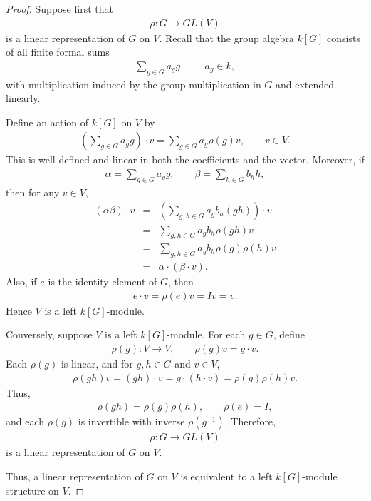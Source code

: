 \documentclass[10pt,a4paper]{amsart}
\begin{document}
\begin{proof}
Suppose first that
\begin{eqnarray}
\rho:G \to GL(V)
\end{eqnarray}
is a linear representation of $G$ on $V$. Recall that the group algebra
$k[G]$ consists of all finite formal sums
\begin{eqnarray}
\sum_{g \in G} a_g g, \qquad a_g \in k,
\end{eqnarray}
with multiplication induced by the group multiplication in $G$ and extended
linearly.

Define an action of $k[G]$ on $V$ by
\begin{eqnarray}
\left(\sum_{g \in G} a_g g\right)\cdot v
=
\sum_{g \in G} a_g \rho(g)v,
\qquad v \in V.
\end{eqnarray}
This is well-defined and linear in both the coefficients and the vector.
Moreover, if
\begin{eqnarray}
\alpha = \sum_{g \in G} a_g g, \qquad
\beta = \sum_{h \in G} b_h h,
\end{eqnarray}
then for any $v\in V$,
\begin{eqnarray*}
(\alpha\beta)\cdot v
&=&
\left(\sum_{g,h \in G} a_g b_h (gh)\right)\cdot v \\
&=&
\sum_{g,h \in G} a_g b_h \rho(gh)v \\
&=&
\sum_{g,h \in G} a_g b_h \rho(g)\rho(h)v \\
&=&
\alpha \cdot (\beta \cdot v).
\end{eqnarray*}
Also, if $e$ is the identity element of $G$, then
\begin{eqnarray*}
e \cdot v = \rho(e)v = Iv = v.
\end{eqnarray*}
Hence $V$ is a left $k[G]$-module.

Conversely, suppose $V$ is a left $k[G]$-module. For each $g \in G$, define
\begin{eqnarray}
\rho(g):V \to V, \qquad \rho(g)v = g \cdot v.
\end{eqnarray}
Each $\rho(g)$ is linear, and for $g,h \in G$ and $v \in V$,
\begin{eqnarray*}
\rho(gh)v = (gh)\cdot v = g \cdot (h \cdot v) = \rho(g)\rho(h)v.
\end{eqnarray*}
Thus,
\begin{eqnarray*}
\rho(gh)=\rho(g)\rho(h), \qquad \rho(e)=I,
\end{eqnarray*}
and each $\rho(g)$ is invertible with inverse $\rho(g^{-1})$. Therefore,
\begin{eqnarray}
\rho:G \to GL(V)
\end{eqnarray}
is a linear representation of $G$ on $V$.

Thus, a linear representation of $G$ on $V$ is equivalent to a left
$k[G]$-module structure on $V$.
\end{proof}
\end{document}
